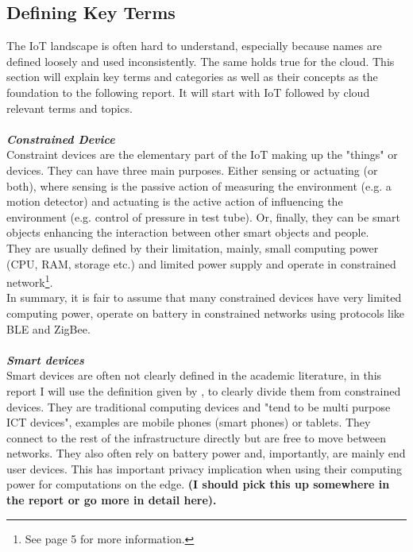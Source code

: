 \subsection{Defining Key Terms}
The IoT landscape is often hard to understand, especially because names are defined loosely and  used inconsistently. The same holds true for the cloud. This section will explain key terms and categories as well as their concepts as the foundation to the following report. It will start with IoT followed by cloud relevant terms and topics. \\

\vspace{0.5mm}\\
\textbf{\textit{Constrained Device}}\\
Constraint devices are the elementary part of the IoT making up the "things" or devices\cite{contstraintDevicesTerminology}. They can have three main purposes. Either sensing or actuating (or both), where sensing is the passive action of measuring the environment (e.g. a motion detector) and actuating is the active action of influencing the environment (e.g. control of pressure in test tube). Or, finally, they can be smart objects enhancing the interaction between other smart objects and people.\\
They are usually defined by their limitation, mainly, small computing power (CPU, RAM, storage etc.) and limited power supply and operate in constrained network\footnote{See \cite{contstraintDevicesTerminology} page 5 for more information.}.\\
In summary, it is fair to assume that many constrained devices have very limited computing power, operate on battery in constrained networks using protocols like BLE and ZigBee. \\

\vspace{0.5mm}\\
\textbf{\textit{Smart devices}}\\
Smart devices are often not clearly defined in the academic literature, in this report I will use the definition given by \citeauthor{poslad2011smartDevices}\cite{poslad2011smartDevices}, to clearly divide them from constrained devices. They are traditional computing devices and "tend to be multi purpose ICT devices"\cite{poslad2011smartDevices}, examples are mobile phones (smart phones) or tablets. They connect to the rest of the infrastructure directly but are free to move between networks. They also often rely on battery power and, importantly, are mainly end user devices. This has important privacy implication when using their computing power for computations on the edge. \textbf{(I should pick this up somewhere in the report or go more in detail here).}\\

